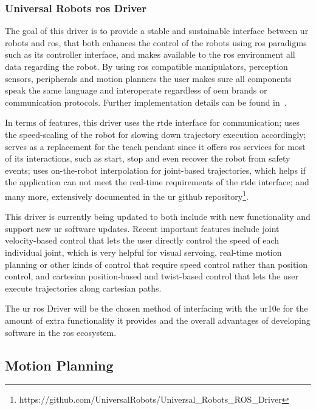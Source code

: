 
\subsubsection{Universal Robots \ac{ros} Driver}

\par The goal of this driver is to provide a stable and sustainable interface between \ac{ur} robots and \ac{ros}, that both enhances the control of the robots using \ac{ros} paradigms such as its controller interface, and makes available to the \ac{ros} environment all data regarding the robot. By using \ac{ros} compatible manipulators, perception sensors, peripherals and motion planners the user makes sure all components speak the same language and interoperate regardless of \acs{oem} brands or communication protocols. Further implementation details can be found in~\cite{ur.ros.driver}.
\par In terms of features, this driver uses the \ac{rtde} interface for communication; uses the speed-scaling of the robot for slowing down trajectory execution accordingly; serves as a replacement for the teach pendant since it offers \ac{ros} services for most of its interactions, such as start, stop and even recover the robot from safety events; uses on-the-robot interpolation for joint-based trajectories, which helps if the application can not meet the real-time requirements of the \ac{rtde} interface; and many more, extensively documented in the \ac{ur} github repository\footnote{https://github.com/UniversalRobots/Universal\_Robots\_ROS\_Driver}.
\par This driver is currently being updated to both include with new functionality and support new \ac{ur} software updates. Recent important features include joint velocity-based control that lets the user directly control the speed of each individual joint, which is very helpful for visual servoing, real-time motion planning or other kinds of control that require speed control rather than position control, and cartesian position-based and twist-based control that lets the user execute trajectories along cartesian paths.
\par The \ac{ur} \ac{ros} Driver will be the chosen method of interfacing with the \ac{ur10e} for the amount of extra functionality it provides and the overall advantages of developing software in the \ac{ros} ecosystem.



\subsection{Motion Planning}

